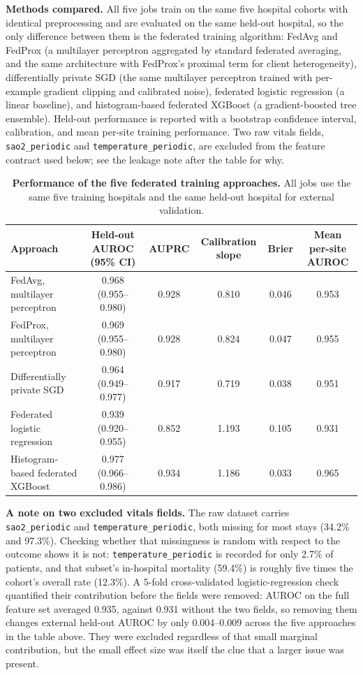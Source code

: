 \documentclass[10pt,a4paper]{article}
\begin{document}
\textbf{Methods compared.} All five jobs train on the same five hospital cohorts with
identical preprocessing and are evaluated on the same held-out hospital, so the only
difference between them is the federated training algorithm: FedAvg and FedProx
(a multilayer perceptron aggregated by standard federated averaging, and the same
architecture with FedProx's proximal term for client heterogeneity), differentially
private SGD (the same multilayer perceptron trained with per-example gradient
clipping and calibrated noise), federated logistic regression (a linear baseline),
and histogram-based federated XGBoost (a gradient-boosted tree ensemble). Held-out
performance is reported with a bootstrap confidence interval, calibration, and mean
per-site training performance. Two raw vitals fields, \texttt{sao2\_periodic} and
\texttt{temperature\_periodic}, are excluded from the feature contract used below;
see the leakage note after the table for why.

\begin{table}[h]
\centering
\caption{\textbf{Performance of the five federated training approaches.} All jobs use
the same five training hospitals and the same held-out hospital for external
validation.}
\label{tab:supp-casestudyperformance}
\footnotesize
\begin{tabular}{@{}lccccc@{}}
\toprule
\textbf{Approach} & \textbf{Held-out AUROC (95\% CI)} & \textbf{AUPRC} & \textbf{Calibration slope} & \textbf{Brier} & \textbf{Mean per-site AUROC}\\
\midrule
FedAvg, multilayer perceptron & 0.968 (0.955--0.980) & 0.928 & 0.810 & 0.046 & 0.953\\
FedProx, multilayer perceptron & 0.969 (0.955--0.980) & 0.928 & 0.824 & 0.047 & 0.955\\
Differentially private SGD & 0.964 (0.949--0.977) & 0.917 & 0.719 & 0.038 & 0.951\\
Federated logistic regression & 0.939 (0.920--0.955) & 0.852 & 1.193 & 0.105 & 0.931\\
Histogram-based federated XGBoost & 0.977 (0.966--0.986) & 0.934 & 1.186 & 0.033 & 0.965\\
\bottomrule
\end{tabular}
\end{table}

\textbf{A note on two excluded vitals fields.} The raw dataset carries
\texttt{sao2\_periodic} and \texttt{temperature\_periodic}, both missing for most
stays (34.2\% and 97.3\%). Checking whether that missingness is random with respect
to the outcome shows it is not: \texttt{temperature\_periodic} is recorded for only
2.7\% of patients, and that subset's in-hospital mortality (59.4\%) is roughly five
times the cohort's overall rate (12.3\%). A 5-fold cross-validated logistic-regression
check quantified their contribution before the fields were removed: AUROC on the full
feature set averaged 0.935, against 0.931 without the two fields, so removing them
changes external held-out AUROC by only 0.004--0.009 across the five approaches in the
table above. They were excluded regardless of that small marginal contribution, but
the small effect size was itself the clue that a larger issue was present.
\end{document}
